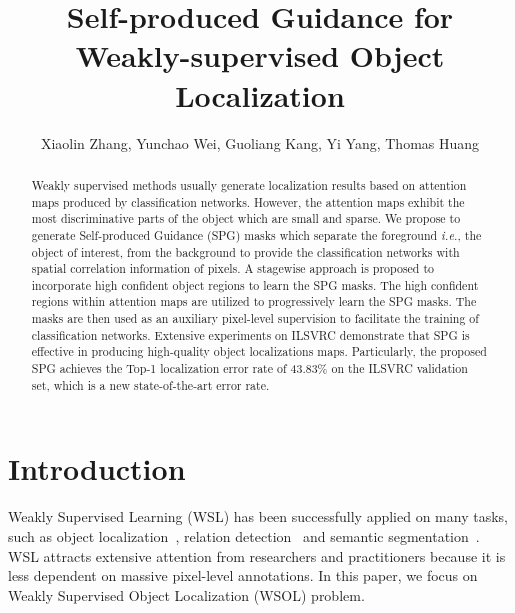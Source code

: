 \documentclass[runningheads]{llncs}
\newcommand{\ie}{\emph{i.e.}}
\begin{document}
\pagestyle{headings}
\mainmatter


\title{Self-produced Guidance for Weakly-supervised Object Localization} 


\author{
Xiaolin Zhang,
Yunchao Wei,
Guoliang Kang,
Yi Yang,
Thomas Huang
}




\maketitle

\begin{abstract}
Weakly supervised methods usually generate localization results based on attention maps produced by classification networks.
However, the attention maps exhibit the most discriminative parts of the object which are small and sparse.
We propose to generate Self-produced Guidance (SPG) masks which separate the foreground \ie, the object of interest, from the background to provide the classification networks with spatial correlation information of pixels.
A stagewise approach is proposed to incorporate high confident object regions to learn the SPG masks.
The high confident regions within attention maps are utilized to progressively learn the SPG masks.
The masks are then used as an auxiliary pixel-level supervision to facilitate the training of classification networks.
Extensive experiments on ILSVRC demonstrate that SPG is effective in producing high-quality object localizations maps.
Particularly, the proposed SPG achieves the Top-1 localization error rate of 43.83\% on the ILSVRC validation set, which is a new state-of-the-art error rate.
	
\end{abstract}  



\section{Introduction}
Weakly Supervised Learning (WSL) has been successfully applied on many tasks, such as object localization~\cite{zhou2015cnnlocalization,singh2017hide,dong2017dual,dong2017few,jie2017deep,wei2018ts2c,liang2015towards}, relation detection~\cite{zhang2017ppr} and semantic segmentation~\cite{wei2017object,wei2015stc,wei2018revisiting,wei2016learning,xiao2017transferable}.
WSL attracts extensive attention from researchers and practitioners
because it is less dependent on massive pixel-level annotations.
In this paper, we focus on Weakly Supervised Object Localization (WSOL) problem.
\end{document}
